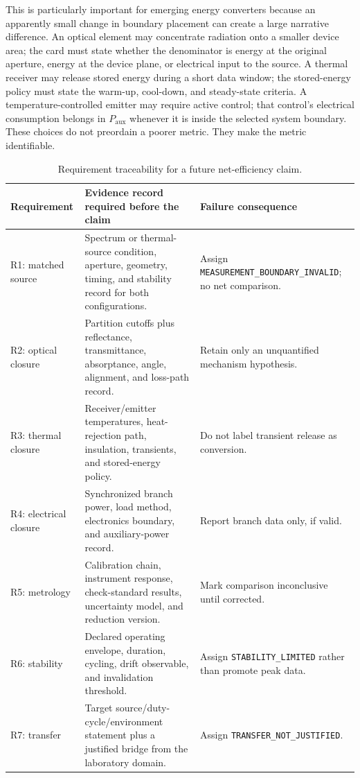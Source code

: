\documentclass[conference]{../../../../Conference-LaTeX-template_10-17-19/IEEEtran}
\begin{document}
This is particularly important for emerging energy converters because an apparently small change in boundary placement can create a large narrative difference. An optical element may concentrate radiation onto a smaller device area; the card must state whether the denominator is energy at the original aperture, energy at the device plane, or electrical input to the source. A thermal receiver may release stored energy during a short data window; the stored-energy policy must state the warm-up, cool-down, and steady-state criteria. A temperature-controlled emitter may require active control; that control's electrical consumption belongs in $P_{\mathrm{aux}}$ whenever it is inside the selected system boundary. These choices do not preordain a poorer metric. They make the metric identifiable.

\begin{table}[!t]
\caption{Requirement traceability for a future net-efficiency claim.}
\label{tab:traceability}
\centering
\small
\begin{tabularx}{\textwidth}{lY Y}
\toprule
Requirement & Evidence record required before the claim & Failure consequence \\
\midrule
R1: matched source & Spectrum or thermal-source condition, aperture, geometry, timing, and stability record for both configurations. & Assign \texttt{MEASUREMENT\_BOUNDARY\_INVALID}; no net comparison. \\
R2: optical closure & Partition cutoffs plus reflectance, transmittance, absorptance, angle, alignment, and loss-path record. & Retain only an unquantified mechanism hypothesis. \\
R3: thermal closure & Receiver/emitter temperatures, heat-rejection path, insulation, transients, and stored-energy policy. & Do not label transient release as conversion. \\
R4: electrical closure & Synchronized branch power, load method, electronics boundary, and auxiliary-power record. & Report branch data only, if valid. \\
R5: metrology & Calibration chain, instrument response, check-standard results, uncertainty model, and reduction version. & Mark comparison inconclusive until corrected. \\
R6: stability & Declared operating envelope, duration, cycling, drift observable, and invalidation threshold. & Assign \texttt{STABILITY\_LIMITED} rather than promote peak data. \\
R7: transfer & Target source/duty-cycle/environment statement plus a justified bridge from the laboratory domain. & Assign \texttt{TRANSFER\_NOT\_JUSTIFIED}. \\
\bottomrule
\end{tabularx}
\end{table}
\end{document}
